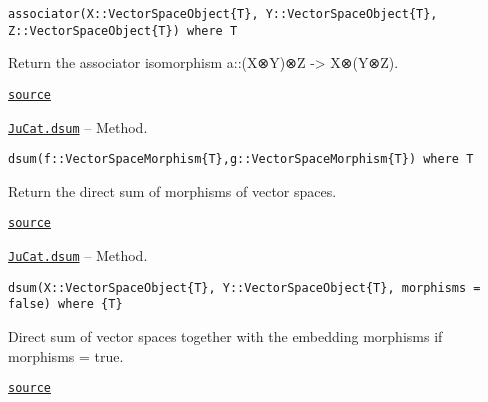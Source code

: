 \documentclass{memoir}
\begin{document}
\begin{adjustwidth}{2em}{0pt}


\begin{verbatim}
associator(X::VectorSpaceObject{T}, Y::VectorSpaceObject{T}, Z::VectorSpaceObject{T}) where T
\end{verbatim}

Return the associator isomorphism a::(X⊗Y)⊗Z -> X⊗(Y⊗Z).



\href{https://github.com/FabianMaeurer/JuCat.jl/blob/367390e2d003deec2ababa73caeab405e934bb35/src/structures/VectorSpaces/VectorSpaces.jl#L319-L323}{\texttt{source}}


\end{adjustwidth}
\hypertarget{9937505529784759153}{} 
\hyperlink{9937505529784759153}{\texttt{JuCat.dsum}}  -- {Method.}

\begin{adjustwidth}{2em}{0pt}


\begin{verbatim}
dsum(f::VectorSpaceMorphism{T},g::VectorSpaceMorphism{T}) where T
\end{verbatim}

Return the direct sum of morphisms of vector spaces.



\href{https://github.com/FabianMaeurer/JuCat.jl/blob/367390e2d003deec2ababa73caeab405e934bb35/src/structures/VectorSpaces/VectorSpaces.jl#L227-L231}{\texttt{source}}


\end{adjustwidth}
\hypertarget{1177256512019415858}{} 
\hyperlink{1177256512019415858}{\texttt{JuCat.dsum}}  -- {Method.}

\begin{adjustwidth}{2em}{0pt}


\begin{verbatim}
dsum(X::VectorSpaceObject{T}, Y::VectorSpaceObject{T}, morphisms = false) where {T}
\end{verbatim}

Direct sum of vector spaces together with the embedding morphisms if morphisms = true.



\href{https://github.com/FabianMaeurer/JuCat.jl/blob/367390e2d003deec2ababa73caeab405e934bb35/src/structures/VectorSpaces/VectorSpaces.jl#L195-L199}{\texttt{source}}


\end{adjustwidth}
\end{document}
